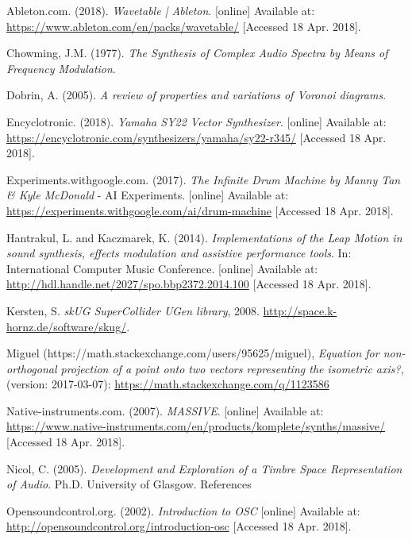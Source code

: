 \documentclass[11pt, oneside]{report}   	%
\begin{document}

\begin{thebibliography}{9}
\singlespacing

Ableton.com. (2018). \emph{Wavetable | Ableton}. [online] Available at: \url{https://www.ableton.com/en/packs/wavetable/} [Accessed 18 Apr. 2018].

Chowming, J.M. (1977). \emph{The Synthesis of Complex Audio Spectra by Means of Frequency Modulation}.

Dobrin, A. (2005). \emph{A review of properties and variations of Voronoi diagrams}. 

Encyclotronic. (2018). \emph{Yamaha SY22 Vector Synthesizer}. [online] Available at: \url{https://encyclotronic.com/synthesizers/yamaha/sy22-r345/} [Accessed 18 Apr. 2018].

Experiments.withgoogle.com. (2017). \emph{The Infinite Drum Machine by Manny Tan \& Kyle McDonald} - AI Experiments. [online] Available at: \url{https://experiments.withgoogle.com/ai/drum-machine} [Accessed 18 Apr. 2018].

Hantrakul, L. and Kaczmarek, K. (2014). \emph{Implementations of the Leap Motion in sound synthesis, effects modulation and assistive performance tools}. In: International Computer Music Conference. [online] Available at:  \url{http://hdl.handle.net/2027/spo.bbp2372.2014.100} [Accessed 18 Apr. 2018].

Kersten, S. \emph{skUG SuperCollider UGen library}, 2008. \url{http://space.k- hornz.de/software/skug/}.

Miguel (https://math.stackexchange.com/users/95625/miguel), \emph{Equation for non-orthogonal projection of a point onto two vectors representing the isometric axis?}, (version: 2017-03-07): \url{https://math.stackexchange.com/q/1123586}

Native-instruments.com. (2007). \emph{MASSIVE}. [online] Available at: \url{https://www.native-instruments.com/en/products/komplete/synths/massive/} [Accessed 18 Apr. 2018].

Nicol, C. (2005). \emph{Development and Exploration of a Timbre Space Representation of Audio}. Ph.D. University of Glasgow.
References

Opensoundcontrol.org. (2002). \emph{Introduction to OSC} [online] Available at: \url{http://opensoundcontrol.org/introduction-osc} [Accessed 18 Apr. 2018].


\end{thebibliography}
\end{document}
